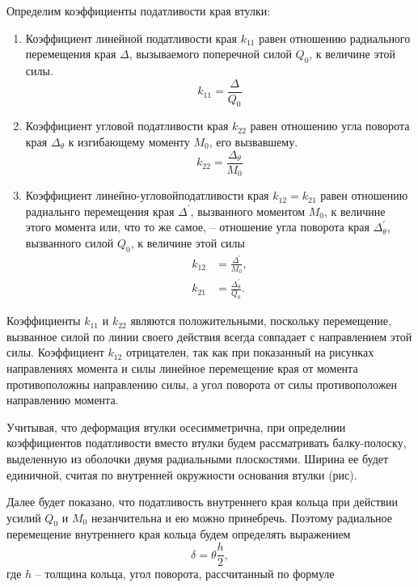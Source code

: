Определим коэффициенты податливости края втулки: 
\begin{enumerate}
  \item Коэффициент линейной податливости края $k_{11}$ равен отношению радиального перемещения края $\Delta$, вызываемого поперечной силой $Q_0$, к величине этой силы.
  \begin{equation}
    k_{11}=\frac{\Delta}{Q_0}
    \label{GeneralSystem_eq2}
  \end{equation}
  \item Коэффициент угловой податливости края $k_{22}$ равен отношению угла поворота края ${\Delta}_{\theta}$ к изгибающему моменту $M_0$, его вызвавшему.
  \begin{equation}
    k_{22}=\frac{{\Delta}_{\theta}}{M_0}
    \label{GeneralSystem_eq3}
  \end{equation}
  \item Коэффициент линейно-угловойподатливости края $k_{12}=k_{21}$ равен отношению радиальнго перемещения края ${\Delta}^{\prime}$, вызванного моментом $M_0$, к величине этого момента или, что то же самое, -- отношение угла поворота края ${\Delta}_{\theta}^{\prime}$, вызванного силой $Q_0$, к величине этой силы
  \begin{equation}
    \begin{split}
      k_{12}&=\frac{{\Delta}^{\prime}}{M_0},\\
      k_{21}&=\frac{{\Delta}_{\theta}^{\prime}}{Q_0}.
    \end{split}
    \label{GeneralSystem_eq4}
  \end{equation} 
  \end{enumerate}

Коэффициенты $k_{11}$ и $k_{22}$ являются положительными, поскольку перемещение, вызванное силой по линии своего действия всегда совпадает с направлением этой силы.
Коэффициент $k_{12}$ отрицателен, так как при показанный на рисунках направлениях момента и силы линейное перемещение края от момента противоположны направлению силы, а угол поворота от силы противоположен направлению момента. 

Учитывая, что деформация втулки осесимметрична, при определнии коэффициентов податливости вместо втулки будем рассматривать балку-полоску, выделенную из оболочки двумя радиальными плоскостями.
Ширина ее будет единичной, считая по внутренней окружности основания втулки (рис). 

Далее будет показано, что податливость внутреннего края кольца при действии усилий  $Q_0$ и $M_0$ незанчительна и ею можно принебречь.
Поэтому радиальное перемещение внутреннего края кольца будем определять выражением
\begin{equation}
  \delta=\theta \frac{h}{2},
  \label{GeneralSystem_eq5}
\end{equation} 
где $h$ -- толщина кольца, угол поворота, рассчитанный по формуле 

